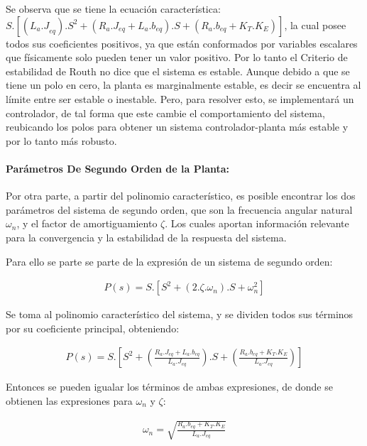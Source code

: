 \documentclass{article}
\begin{document}
\begin{sloppypar}
Se observa que se tiene la ecuación característica: $S.[({L_a.J}_{eq}).S^2+(R_a.J_{eq}+L_a.b_{eq}).S+(R_a.b_{eq}+K_T.K_E)]$, la cual posee todos sus coeficientes positivos, ya que están conformados por variables escalares que físicamente solo pueden tener un valor positivo. Por lo tanto el Criterio de estabilidad de Routh no dice que el sistema es estable. Aunque debido a que se tiene un polo en cero, la planta es marginalmente estable, es decir se encuentra al límite entre ser estable o inestable. Pero, para resolver esto, se implementará un controlador, de tal forma que este cambie el comportamiento del sistema, reubicando los polos para obtener un sistema controlador-planta más estable y por lo tanto más robusto.


\paragraph{Parámetros De Segundo Orden de la Planta:}
\label{sec:Parámetros De Segundo Orden de la Planta:}
\hfill

\hfill

Por otra parte, a partir del polinomio característico, es posible encontrar los dos parámetros del sistema de segundo orden, que son la frecuencia angular natural $\omega_n$, y el factor de amortiguamiento $\zeta$. Los cuales aportan información relevante para la convergencia y la estabilidad de la respuesta del sistema.

Para ello se parte se parte de la expresión de un sistema de segundo orden:

\begin{align} \label{eq:Expresión del Polinomio Característico}
    P\left(s\right)=S.\left[S^2+\left(2.\zeta.\omega_n\right).S+\omega_n^2\right]
\end{align}

Se toma al polinomio característico del sistema, y se dividen todos sus términos por su coeficiente principal, obteniendo:

\begin{align} \label{eq:Polinomio Característico del Sistema}
    P\left(s\right)=S.\left[S^2+\left(\frac{R_a.J_{eq}+L_a.b_{eq}}{L_a.J_{eq}}\right).S+\left(\frac{R_a.b_{eq}+K_T.K_E}{L_a.J_{eq}}\right)\right]
\end{align}

Entonces se pueden igualar los términos de ambas expresiones, de donde se obtienen las expresiones para $\omega_n$ y $\zeta$:

\begin{align} \label{eq:Frecuencia Natural}
    \omega_n=\sqrt{\frac{R_a.b_{eq}+K_T.K_E}{L_a.J_{eq}}}
\end{align}


\end{sloppypar}
\end{document}
